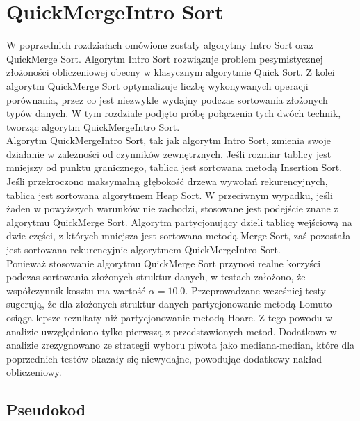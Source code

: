 \newpage
\section{QuickMergeIntro Sort}
W poprzednich rozdziałach omówione zostały algorytmy Intro Sort oraz QuickMerge Sort. Algorytm Intro Sort rozwiązuje problem pesymistycznej złożoności obliczeniowej obecny w klasycznym algorytmie Quick Sort. Z kolei algorytm QuickMerge Sort optymalizuje liczbę wykonywanych operacji porównania, przez co jest niezwykle wydajny podczas sortowania złożonych typów danych. W tym rozdziale podjęto próbę połączenia tych dwóch technik, tworząc algorytm QuickMergeIntro Sort.\\

Algorytm QuickMergeIntro Sort, tak jak algorytm Intro Sort, zmienia swoje działanie w zależności od czynników zewnętrznych. Jeśli rozmiar tablicy jest mniejszy od punktu granicznego, tablica jest sortowana metodą Insertion Sort. Jeśli przekroczono maksymalną głębokość drzewa wywołań rekurencyjnych, tablica jest sortowana algorytmem Heap Sort. W przeciwnym wypadku, jeśli żaden w powyższych warunków nie zachodzi, stosowane jest podejście znane z algorytmu QuickMerge Sort. Algorytm partycjonujący dzieli tablicę wejściową na dwie części, z których mniejsza jest sortowana metodą Merge Sort, zaś pozostała jest sortowana rekurencyjnie algorytmem QuickMergeIntro Sort.\\

Ponieważ stosowanie algorytmu QuickMerge Sort przynosi realne korzyści podczas sortowania złożonych struktur danych, w testach założono, że współczynnik kosztu ma wartość $\alpha = 10.0$. Przeprowadzane wcześniej testy sugerują, że dla złożonych struktur danych partycjonowanie metodą Lomuto osiąga lepsze rezultaty niż partycjonowanie metodą Hoare. Z tego powodu w analizie uwzględniono tylko pierwszą z przedstawionych metod. Dodatkowo w analizie zrezygnowano ze strategii wyboru piwota jako mediana-median, które dla poprzednich testów okazały się niewydajne, powodując dodatkowy nakład obliczeniowy.\\

\subsection{Pseudokod}

